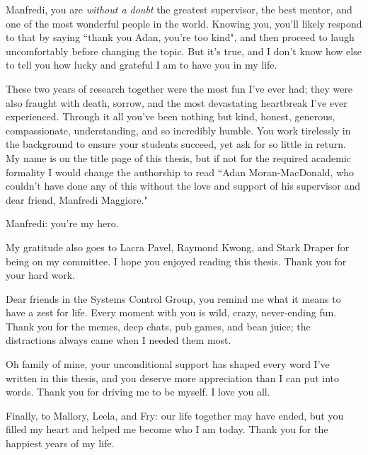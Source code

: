 

\begin{acknowledgements}
    Manfredi, you are \textit{without a doubt} the greatest supervisor, the
    best mentor, and one of the most wonderful people in the world.
    Knowing you, you'll likely respond to that by saying 
    ``thank you Adan, you're too kind", and then proceed to laugh uncomfortably before
    changing the topic.
    But it's true, and I don't know how else to tell you how lucky and grateful I am to
    have you in my life.

    These two years of research together were the most fun I've ever
    had; they were also fraught with death, sorrow, and the most
    devastating heartbreak I've ever experienced.
    Through it all you've been nothing but kind, honest, generous,
    compassionate, understanding, and so incredibly humble.
    You work tirelessly in the background to ensure your students
    succeed, yet ask for so little in return.
    My name is on the title page of this thesis, but if not for the required
    academic formality I would change the authorship to read
    ``Adan Moran-MacDonald, who couldn't have done any of this without the love
    and support of his supervisor and dear friend, Manfredi Maggiore."

    Manfredi: you're my hero. 

    \bigskip %

    My gratitude also goes to Lacra Pavel, Raymond Kwong, and Stark Draper for
    being on my committee. I hope you enjoyed reading this thesis. Thank you for
    your hard work.

    Dear friends in the Systems Control Group,
    you remind me what it means to have a zest for life. 
    Every moment with you is wild, crazy, never-ending fun. Thank you
    for the memes, deep chats, pub games, and bean juice; the distractions
    always came when I needed them most.

    Oh family of mine, your unconditional support has shaped every word I've
    written in this thesis, and you deserve more appreciation than I can put
    into words. Thank you for driving me to be myself. I love you all.

    Finally, to Mallory, Leela, and Fry: our life together may have ended, but
    you filled my heart and helped me become who I am today. 
    Thank you for the happiest years of my life.

\end{acknowledgements}

